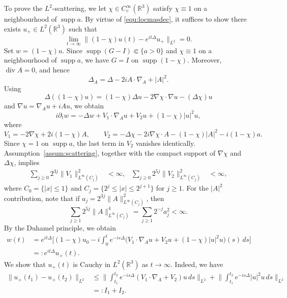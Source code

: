 \documentclass[10pt%
]{amsart}
\numberwithin{equation}{section}
\newcommand{\R}{\mathbb{R}}
\theoremstyle{definition}
\def\div{\mathop{\mathrm{div}}\nolimits}
\begin{document}
To prove the $L^2$-scattering, we let $\chi\in C_c^\infty(\R^3)$ satisfy $\chi\equiv1$ on a neighbourhood of $\operatorname{supp}a$. By virtue of \eqref{equ:locmasdec}, it suffices to show there exists $u_+\in L^2(\R^3)$ such that
\begin{equation}\label{equ:1-chismall}
	\lim_{t\to\infty}\|(1-\chi)u(t)-e^{it\Delta}u_+\|_{L^2}=0.
\end{equation}
Set $w=(1-\chi)u$. Since $\operatorname{supp}(G-I)\Subset\{a>0\}$ and $\chi\equiv1$ on a neighbourhood of $\operatorname{supp}a$, we have $G=I$ on $\operatorname{supp}(1-\chi)$. Moreover, $\div A=0$, and hence
\[
\Delta_A=\Delta-2iA\cdot\nabla_A+|A|^2.
\]
Using
\[
\Delta((1-\chi)u)=(1-\chi)\Delta u-2\nabla\chi\cdot\nabla u-(\Delta\chi)u
\]
and $\nabla u=\nabla_Au+iAu$, we obtain
\begin{equation}\label{equ:w-exterior}
 i\partial_tw=-\Delta w+V_1\cdot\nabla_Au+V_2u+(1-\chi)|u|^2u,
\end{equation}
where
\begin{equation}\label{equ:V1V2-correct}
 V_1=-2\nabla\chi+2i(1-\chi)A,
 \qquad
 V_2=-\Delta\chi-2i\nabla\chi\cdot A-(1-\chi)|A|^2-i(1-\chi)a.
\end{equation}
Since $\chi=1$ on $\operatorname{supp}a$, the last term in $V_2$ vanishes identically. Assumption~\ref{assum:scattering}, together with the compact support of $\nabla\chi$ and $\Delta\chi$, implies
\begin{align}
 \sum_{j\ge0}2^{3j}\|V_1\|_{L^\infty(C_j)}^2&<\infty,
 &
 \sum_{j\ge0}2^{5j}\|V_2\|_{L^\infty(C_j)}^2&<\infty,
 \label{proof_scattering_1}
\end{align}
where $C_0=\{|x|\le1\}$ and $C_j=\{2^j\le|x|\le2^{j+1}\}$ for $j\ge1$. For the $|A|^2$ contribution, note that if $a_j=2^{3j}\|A\|_{L^\infty(C_j)}^2$, then
\[
\sum_{j\ge1}2^{5j}\|A\|_{L^\infty(C_j)}^4
=\sum_{j\ge1}2^{-j}a_j^2<\infty.
\]
By the Duhamel principle, we obtain
\begin{align*}
	w(t)&=e^{it\Delta}\Big[(1-\chi)u_0-i\int_0^t e^{-is\Delta}\big(V_1\cdot \nabla_Au+V_2u+(1-\chi)|u|^{2}u\big)(s)\,ds\Big]\\
	&=: e^{it\Delta}u_+(t).
\end{align*}
We show that $u_+(t)$ is Cauchy in $L^2(\R^3)$ as $t\to \infty$. Indeed, we have
\begin{align*}
	\big\|u_+(t_1)-u_+(t_2)\big\|_{L^2}
	&\le \Big\|\int_{t_1}^{t_2} e^{-is\Delta}(V_1\cdot \nabla_A+V_2)u\,ds\Big\|_{L^2}%
	+\Big\|\int_{t_1}^{t_2} e^{-is\Delta}|u|^2u\,ds\Big\|_{L^2}\\
	&=: I_1+I_2.
\end{align*}
\end{document}
